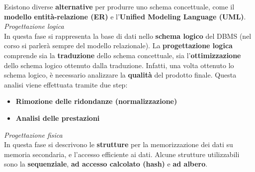 \documentclass{article}
\begin{document}
Esistono diverse \textbf{alternative} per produrre uno schema concettuale, come il \textbf{modello entità-relazione (ER)} e l'\textbf{Unified Modeling Language (UML)}.\vspace*{14pt}\\
\textit{Progettazione logica}\\
In questa fase si rappresenta la base di dati nello \textbf{schema logico} del DBMS (nel corso si parlerà sempre del modello relazionale). La \textbf{progettazione logica} comprende sia la \textbf{traduzione} dello schema concettuale, sia l'\textbf{ottimizzazione} dello schema logico ottenuto dalla traduzione. Infatti, una volta ottenuto lo schema logico, è necessario analizzare la \textbf{qualità} del prodotto finale. Questa analisi viene effettuata tramite due step:
\begin{itemize}[label={-}, leftmargin=1cm]
    \itemsep0em
    \item \textbf{Rimozione delle ridondanze (normalizzazione)}
    \item \textbf{Analisi delle prestazioni}
\end{itemize}
\textit{Progettazione fisica}\\
In questa fase si descrivono le \textbf{strutture} per la memorizzazione dei dati su memoria secondaria, e l'accesso efficiente ai dati. Alcune strutture utilizzabili sono la \textbf{sequenziale}, \textbf{ad accesso calcolato (hash)} e \textbf{ad albero}.
\end{document}
